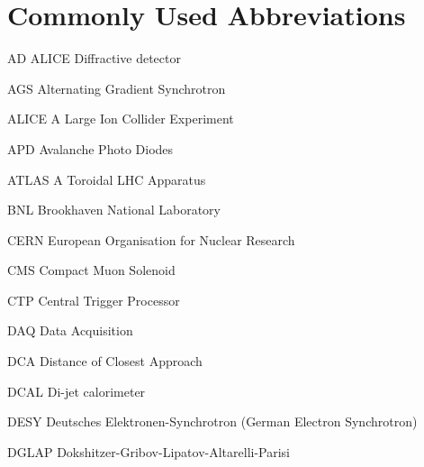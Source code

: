 
 
 
\chapter{Commonly Used Abbreviations}
 \label{app:symbols}

\begin{abbrv}
 
\item[AD]				ALICE Diffractive detector
\item[AGS]			Alternating Gradient Synchrotron
\item[ALICE]			A Large Ion Collider Experiment 
\item[APD]			Avalanche Photo Diodes
\item[ATLAS]			A Toroidal LHC Apparatus 
 
\item[BNL]				Brookhaven National Laboratory 
 
\item[CERN]			European Organisation for Nuclear Research 
 \item[CMS]			Compact Muon Solenoid
 \item[CTP]			Central Trigger Processor

\item[DAQ]			Data Acquisition 
\item[DCA]			Distance of Closest Approach
\item[DCAL]			Di-jet calorimeter
\item[DESY] 			Deutsches Elektronen-Synchrotron (German Electron Synchrotron)
 \item[DGLAP]			Dokshitzer-Gribov-Lipatov-Altarelli-Parisi


\end{abbrv}
